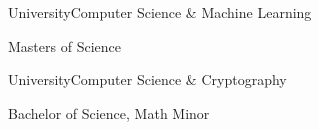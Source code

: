\documentclass{article}
\newenvironment{*mylist}[2]{
  \subsection*{#1}
  \small
  \begin{list}{}{}
   \setlength{\topsep}{0pt}
   \setlength{\itemsep}{1pt}
   \setlength{\parskip}{0pt}
   \setlength{\parsep}{0pt}
 \item {\bf #2}
}{\end{list}\normalsize}
\newcommand{\LUx}[1]{{\bf\em #1}}
\begin{document}
\begin{comment}
\item \href{https://github.com/probinso/adarailz}{AdaRailz Concurrent Model Train Control System}\hfill\LUx{Ada}
\item TwixT AI Agent \& UI\hfill\LUx{Java}
\item Image Manipulation Program \hfill\LUx{C\#}
\item Unix Shell \hfill\LUx{C}
\end{**mylist}
\normalsize
\end{comment}

\BSec{}

\begin{multicols}{2}

  \begin{*mylist}{ University}{Computer Science \& Machine Learning}
  \item Masters of Science %
\end{*mylist}\columnbreak

  \raggedright
  \begin{*mylist}{ University}{Computer Science \& Cryptography}
  \item Bachelor of Science, Math Minor %
  \end{*mylist}
\end{multicols}
\end{document}
